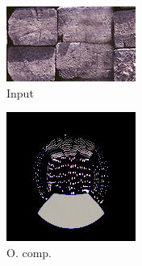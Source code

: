 \begin{figure}[]
\begin{subfigure}{\textwidth}
        \begin{subfigure}{0.19\textwidth}
            \centering
            \includegraphics[width=\textwidth]{images/04-experiment03/ball_beams_target.jpg}
            \caption*{Input}
        \end{subfigure}
        \hfill
        \begin{subfigure}{0.19\textwidth}
            \centering
            \includegraphics[width=\textwidth]{images/04-experiment03/ball_dof/beams/stats_im.jpg}
            \caption*{O. comp.}
        \end{subfigure}
        \hfill
        \begin{subfigure}{0.19\textwidth}

\end{subfigure}
\end{subfigure}
\end{figure}
